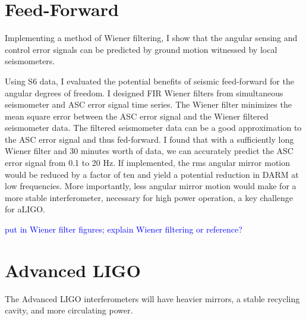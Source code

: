 \section{Feed-Forward}
Implementing a method of Wiener ﬁltering, I show that the angular
sensing and control error signals can be predicted by ground motion
witnessed by local seismometers.

Using S6 data, I evaluated the potential benefits of seismic
feed-forward for the angular degrees of freedom. I designed FIR Wiener
filters from simultaneous seismometer and ASC error signal time
series. The Wiener filter minimizes the mean square error between the
ASC error signal and the Wiener filtered seismometer data. The
filtered seismometer data can be a good approximation to the ASC error
signal and thus fed-forward. I found that with a sufficiently long
Wiener filter and 30 minutes worth of data, we can accurately predict
the ASC error signal from 0.1 to 20 Hz. If implemented, the rms
angular mirror motion would be reduced by a factor of ten and yield a
potential reduction in DARM at low frequencies. More importantly, less
angular mirror motion would make for a more stable interferometer,
necessary for high power operation, a key challenge for aLIGO.

\textcolor{blue}{put in Wiener filter figures; explain Wiener
  filtering or reference?}

\section{Advanced LIGO}
The Advanced LIGO interferometers will have heavier mirrors, a stable
recycling cavity, and more circulating power. 